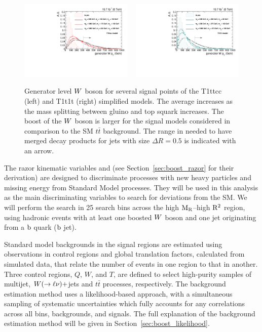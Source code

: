 \begin{figure}[htpb]
\centering
\includegraphics[width=0.48\textwidth]{figures/razor_strategy/T1ttcc_genWpt}
~
\includegraphics[width=0.48\textwidth]{figures/razor_strategy/T1t1t_genWpt}
\caption{Generator level $W$ boson \pt for several signal points of the T1ttcc (left) and T1t1t
(right)
simplified models. The average \pt increases as the mass splitting between gluino and top
squark increases. The boost of the $W$
boson is larger for the signal models considered in comparison to the SM $t\bar{t}$
background. 
The range in \pt needed to have merged decay products for jets with size $\Delta R = 0.5$ is
indicated with an arrow.
\label{fig:boost_gen_Wpt}}
\end{figure}

The razor kinematic variables \mr and \rsq (see Section~\ref{sec:boost_razor} for their
derivation) 
are designed to discriminate processes with new heavy particles and missing energy from Standard
Model processes.
They will be used in this analysis as the main discriminating variables to search for deviations
from the SM. We will perform the search in 25 search bins across the high $\mathrm{M_R}$--high $\mathrm{R^2}$ region,
using hadronic events with at least one boosted $W$ boson and one jet originating from a $\mathrm{b}$
quark (\ie $\mathrm{b}$ jet). 

Standard model backgrounds in the signal regions are estimated using observations in control regions
and global translation factors, calculated from simulated data, that relate the number of events in
one region to that in another. 
Three control regions, $Q$, $W$, and $T$, are defined to select high-purity samples of multijet,
$W(\rightarrow \ell\nu)+$jets and $t\bar{t}$ processes, respectively.  
The background estimation method uses a likelihood-based approach, with a simultaneous sampling
of systematic uncertainties which fully accounts for any correlations across all bins, backgrounds,
and signals.
The full explanation of the background estimation method will be given in
Section~\ref{sec:boost_likelihood}. 



